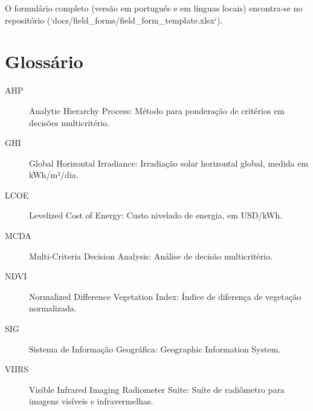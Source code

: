 \documentclass[12pt, a4paper]{article}
\begin{document}
O formulário completo (versão em português e em línguas locais) encontra-se no repositório (`docs/field_forms/field_form_template.xlsx`).

\section*{Glossário}

\begin{description}
\item[AHP] Analytic Hierarchy Process: Método para ponderação de critérios em decisões multicritério.
\item[GHI] Global Horizontal Irradiance: Irradiação solar horizontal global, medida em kWh/m²/dia.
\item[LCOE] Levelized Cost of Energy: Custo nivelado de energia, em USD/kWh.
\item[MCDA] Multi-Criteria Decision Analysis: Análise de decisão multicritério.
\item[NDVI] Normalized Difference Vegetation Index: Índice de diferença de vegetação normalizada.
\item[SIG] Sistema de Informação Geográfica: Geographic Information System.
\item[VIIRS] Visible Infrared Imaging Radiometer Suite: Suíte de radiômetro para imagens visíveis e infravermelhas.
\end{description}

\clearpage
\end{document}
